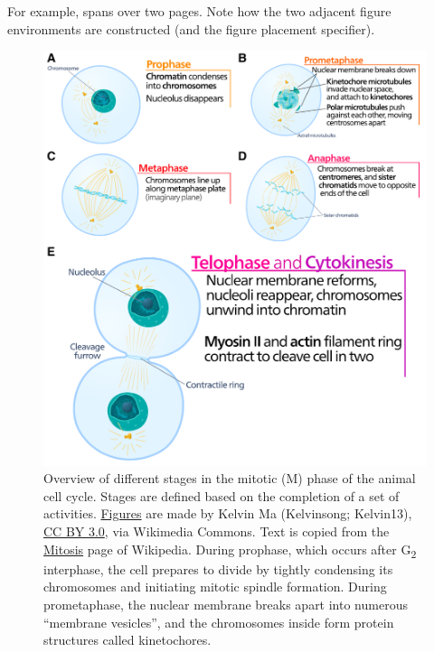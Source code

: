 For example,  spans over two pages. Note how the two adjacent figure environments are constructed (and the figure placement specifier).

\begin{figure}[p]
    \centering
    \includegraphics[width=\linewidth]{figures/cell-cycle-mitosis.pdf}
    \caption[Stages of mitotic phase of the cell cycle]{%
        Overview of different stages in the mitotic (M) phase of the animal cell cycle.
        Stages are defined based on the completion of a set of activities.
        \href{https://commons.wikimedia.org/wiki/File:Animal_cell_cycle-en.svg}{Figures} are made by Kelvin Ma (Kelvinsong; Kelvin13), \href{https://creativecommons.org/licenses/by/3.0}{CC BY 3.0}, via Wikimedia Commons.
        Text is copied from the \href{https://en.wikipedia.org/wiki/Mitosis}{Mitosis} page of Wikipedia.
        During prophase, which occurs after G\textsubscript{2} interphase,
        the cell prepares to divide by tightly condensing its chromosomes and initiating mitotic spindle formation.
        During prometaphase, the nuclear membrane breaks apart into numerous ``membrane vesicles'', and the chromosomes inside form protein structures called kinetochores.
        \legendcontdnote
    }
    \label{fig:cell-cycle-mitosis}
\end{figure}
